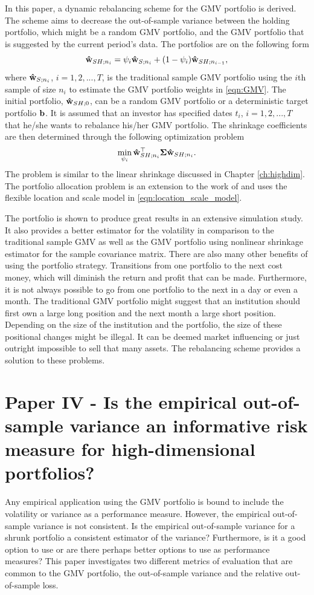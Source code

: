 \documentclass[12pt, twoside]{book}\usepackage{knitr}
\begin{document}
In this paper, a dynamic rebalancing scheme for the GMV portfolio is derived. 
The scheme aims to decrease the out-of-sample variance between the holding portfolio, which might be a random GMV portfolio, and the GMV portfolio that is suggested by the current period's data. 
The portfolios are on the following form
\begin{equation}
  \mathbf{\hat{w}}_{SH;n_{i}}=\psi_{i}\mathbf{\hat{w}}_{S;n_i}+ (1-\psi_{i})\mathbf{\hat{w}}_{SH;n_{i-1}},
\end{equation}
where $\mathbf{\hat{w}}_{S;n_i}$, $i=1,2,...,T$, is the traditional sample GMV portfolio using the $i$th sample of size $n_i$ to estimate the GMV portfolio weights in \eqref{eqn:GMV}. 
The initial portfolio, $\mathbf{\hat{w}}_{SH;0}$, can be a random GMV portfolio or a deterministic target portfolio $\mathbf{b}$.
It is assumed that an investor has specified dates $t_i$, $i=1,2,...,T$ that he/she wants to rebalance his/her GMV portfolio. 
The shrinkage coefficients are then determined through the following optimization problem
$$
\min_{\psi_i} \mathbf{\hat{w}}_{SH;n_{i}}^\top \mathbf{\Sigma} \mathbf{\hat{w}}_{SH;n_{i}}.
$$
The problem is similar to the linear shrinkage discussed in Chapter \ref{ch:highdim}.
The portfolio allocation problem is an extension to the work of \citet{bodnar2018estimation} and uses the flexible location and scale model in \eqref{eqn:location_scale_model}.

The portfolio is shown to produce great results in an extensive simulation study.
It also provides a better estimator for the volatility in comparison to the traditional sample GMV as well as the GMV portfolio using \citet{lw20} nonlinear shrinkage estimator for the sample covariance matrix.
There are also many other benefits of using the portfolio strategy.
Transitions from one portfolio to the next cost money, which will diminish the return and profit that can be made.
Furthermore, it is not always possible to go from one portfolio to the next in a day or even a month.
The traditional GMV portfolio might suggest that an institution should first own a large long position and the next month a large short position.
Depending on the size of the institution and the portfolio, the size of these positional changes might be illegal. 
It can be deemed market influencing or just outright impossible to sell that many assets.
The rebalancing scheme provides a solution to these problems.

\section{Paper IV - Is the empirical out-of-sample variance an informative risk measure for high-dimensional portfolios?}\label{sec:paper4}
Any empirical application using the GMV portfolio is bound to include the volatility or variance as a performance measure. 
However, the empirical out-of-sample variance is not consistent.
Is the empirical out-of-sample variance for a shrunk portfolio a consistent estimator of the variance? 
Furthermore, is it a good option to use or are there perhaps better options to use as performance measures? 
This paper investigates two different metrics of evaluation that are common to the GMV portfolio, the out-of-sample variance and the relative out-of-sample loss.
\end{document}
